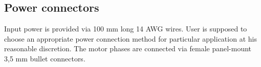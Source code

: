 \subsection{Power connectors}
Input power is provided via 100 mm long 14 AWG wires. 
User is supposed to choose an appropriate power connection method for particular application 
at his reasonable discretion.
The motor phases are connected via female panel-mount 3,5 mm bullet connectors. 

\newpage

